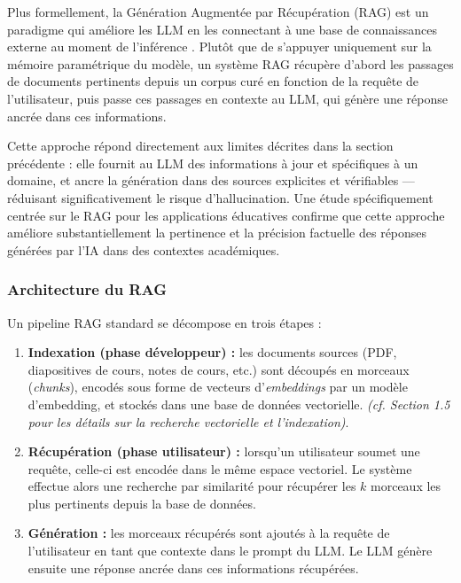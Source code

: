 \documentclass[a4paper,11pt]{article}
\begin{document}
Plus formellement, la Génération Augmentée par Récupération (RAG) est un
paradigme qui améliore les LLM en les connectant à une base de connaissances
externe au moment de l'inférence \cite{lewis2020rag}. Plutôt que de s'appuyer
uniquement sur la mémoire paramétrique du modèle, un système RAG récupère
d'abord les passages de documents pertinents depuis un corpus curé en
fonction de la requête de l'utilisateur, puis passe ces passages en contexte
au LLM, qui génère une réponse ancrée dans ces informations.

Cette approche répond directement aux limites décrites dans la section
précédente : elle fournit au LLM des informations à jour et spécifiques
à un domaine, et ancre la génération dans des sources explicites et
vérifiables --- réduisant significativement le risque d'hallucination.
Une étude spécifiquement centrée sur le RAG pour les applications éducatives
\cite{rag_education_survey} confirme que cette approche améliore
substantiellement la pertinence et la précision factuelle des réponses
générées par l'IA dans des contextes académiques.

\newpage
\subsubsection{Architecture du RAG}

Un pipeline RAG standard se décompose en trois étapes :

\begin{enumerate}
  \item \textbf{Indexation (phase développeur) :} les documents sources
    (PDF, diapositives de cours, notes de cours, etc.) sont découpés en
    morceaux (\emph{chunks}), encodés sous forme de vecteurs
    d'\emph{embeddings} par un modèle d'embedding, et stockés dans une
    base de données vectorielle.
    \emph{(cf. Section 1.5 pour les détails sur la recherche vectorielle
    et l'indexation)}.

  \item \textbf{Récupération (phase utilisateur) :} lorsqu'un utilisateur
    soumet une requête, celle-ci est encodée dans le même espace vectoriel.
    Le système effectue alors une recherche par similarité pour récupérer
    les $k$ morceaux les plus pertinents depuis la base de données.

  \item \textbf{Génération :} les morceaux récupérés sont ajoutés à la
    requête de l'utilisateur en tant que contexte dans le prompt du LLM.
    Le LLM génère ensuite une réponse ancrée dans ces informations
    récupérées.
\end{enumerate}
\end{document}
